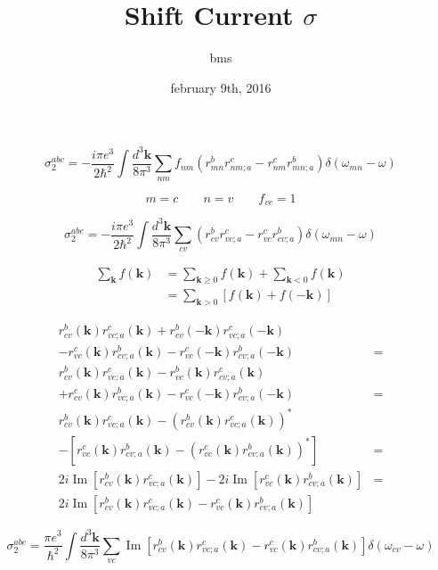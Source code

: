 \documentclass{article}
\title{Shift Current $\sigma$}
\author{bms}
\date{february 9th, 2016}
\begin{document}
\maketitle

\begin{equation*}
\sigma^{abc}_2 = - \frac{i \pi e^{3}}{2 \hbar^{2}} \int \frac{d^{3}\mathbf{k}}{8\pi^{3}}
\sum_{nm}f_{nm}(r^{b}_{mn} r^{c}_{nm;a} - r^{c}_{nm} r^{b}_{mn;a})
\delta(\omega_{mn} - \omega)
\end{equation*}

\begin{equation*}
m = c \qquad
n = v \qquad
f_{vc} = 1
\end{equation*}

\begin{equation*}
\sigma^{abc}_2 = - \frac{i \pi e^{3}}{2 \hbar^{2}} \int \frac{d^{3}\mathbf{k}}{8\pi^{3}}
\sum_{cv}(r^{b}_{cv} r^{c}_{vc;a} - r^{c}_{vc} r^{b}_{cv;a})
\delta(\omega_{mn} - \omega)
\end{equation*}

\begin{align*}
\sum_{\mathbf{k}}f(\mathbf{k}) &= \sum_{\mathbf{k}\geq 0}f(\mathbf{k}) + 
\sum_{\mathbf{k}<0}f(\mathbf{k}) \\
&= \sum_{\mathbf{k}>0} \left[f(\mathbf{k}) + f(\mathbf{-k}) \right]
\end{align*}

\begin{align*}      
  r^{b}_{cv}(\mathbf{k}) r^{c}_{vc;a}(\mathbf{k}) + 
  r^{b}_{cv}(-\mathbf{k})r^{c}_{vc;a}(-\mathbf{k}) & \\
- r^{c}_{vc}(\mathbf{k}) r^{b}_{cv;a}(\mathbf{k}) - 
  r^{c}_{vc}(-\mathbf{k})r^{b}_{cv;a}(-\mathbf{k}) & = \\
  r^{b}_{cv}(\mathbf{k}) r^{c}_{vc;a}(\mathbf{k}) - 
  r^{b}_{vc}(\mathbf{k}) r^{c}_{cv;a}(\mathbf{k}) & \\
+ r^{c}_{cv}(\mathbf{k}) r^{b}_{vc;a}(\mathbf{k}) - 
  r^{c}_{vc}(-\mathbf{k})r^{b}_{cv;a}(-\mathbf{k}) & = \\
  r^{b}_{cv}(\mathbf{k}) r^{c}_{vc;a}(\mathbf{k}) -
  (r^{b}_{cv}(\mathbf{k}) r^{c}_{vc;a}(\mathbf{k}))^{*} \\
- [r^{c}_{vc}(\mathbf{k})r^{b}_{cv;a}(\mathbf{k})
- (r^{c}_{vc}(\mathbf{k})r^{b}_{cv;a}(\mathbf{k}))^{*}] & = \\
  2i \operatorname{Im} [r^{b}_{cv}(\mathbf{k}) r^{c}_{vc;a}(\mathbf{k})] - 
  2i \operatorname{Im} [r^{c}_{vc}(\mathbf{k}) r^{b}_{cv;a}(\mathbf{k})] & = \\
  2i \operatorname{Im} [r^{b}_{cv}(\mathbf{k}) r^{c}_{vc;a}(\mathbf{k}) - 
  r^{c}_{vc}(\mathbf{k}) r^{b}_{cv;a}(\mathbf{k})]
\end{align*}        

\begin{equation*}
\sigma^{abc}_2 = \frac{\pi e^{3}}{\hbar^{2}} \int \frac{d^{3}\mathbf{k}}{8\pi^{3}}
\sum_{vc}\operatorname{Im}[r^{b}_{cv}(\mathbf{k}) r^{c}_{vc;a}(\mathbf{k}) - 
r^{c}_{vc}(\mathbf{k}) r^{b}_{cv;a}(\mathbf{k})]
\delta(\omega_{cv} - \omega)
\end{equation*}
\end{document}
